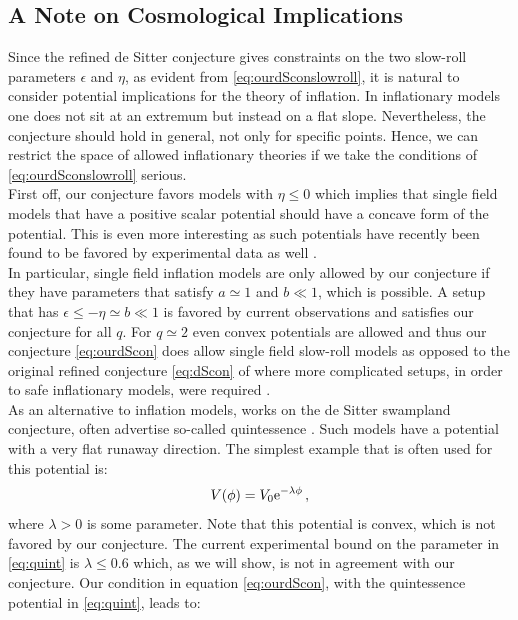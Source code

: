 \documentclass[a4paper,12pt]{report}
\newcommand{\be}{\begin{equation}}
\newcommand{\ee}{\end{equation}}
\def\rme{{\rm e}}
\begin{document}
\subsection{A Note on Cosmological Implications}
Since the refined de Sitter conjecture gives constraints on the two slow-roll parameters $\epsilon$ and $\eta$, as evident from \eqref{eq:ourdSconslowroll}, it is natural to consider potential implications for the theory of inflation. In inflationary models one does not sit at an extremum but instead on a flat slope. Nevertheless, the conjecture should hold in general, not only for specific points. Hence, we can restrict the space of allowed inflationary theories if we take the conditions of \eqref{eq:ourdSconslowroll} serious.\\
First off, our conjecture favors models with $\eta \leq 0$ which implies that single field models that have a positive scalar potential should have a concave form of the potential. This is even more interesting as such potentials have recently been found to be favored by experimental data as well \cite{Planck:2018jri}.\\
In particular, single field inflation models are only allowed by our conjecture if they have parameters that satisfy $a \simeq 1$ and $b \ll 1$, which is possible. A setup that has $\epsilon \leq - \eta \simeq b \ll 1 $ is favored by current observations \cite{Planck:2018jri} and satisfies our conjecture for all $q$. For $q\simeq 2$ even convex potentials are allowed and thus our conjecture \eqref{eq:ourdScon} does allow single field slow-roll models as opposed to the original refined conjecture \eqref{eq:dScon} of \cite{Ooguri:2018wrx} where more complicated setups, in order to safe inflationary models, were required \cite{Achucarro:2018vey,Kehagias:2018uem}.\\
As an alternative to inflation models, works on the de Sitter swampland conjecture, often advertise so-called quintessence \cite{Agrawal:2018own}. Such models have a potential with a very flat runaway direction. The simplest example that is often used for this potential is:
\be 
V(\phi) = V_0 \rme^ {-\lambda \phi}\,,
\label{eq:quint}
\ee
where $\lambda >0$ is some parameter. Note that this potential is convex, which is not favored by our conjecture. The current experimental bound on the parameter in \eqref{eq:quint} is $\lambda \leq 0.6$ \cite{Agrawal:2018own} which, as we will show, is not in agreement with our conjecture. Our condition in equation \eqref{eq:ourdScon}, with the quintessence potential in \eqref{eq:quint}, leads to:
\end{document}
